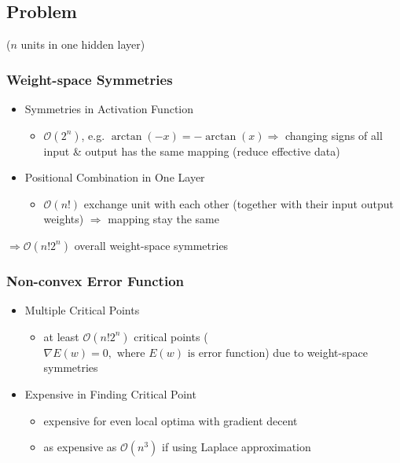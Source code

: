 \subsection{Problem}
($n$ units in one hidden layer)

\subsubsection{Weight-space Symmetries} 
\begin{itemize}
\item Symmetries in Activation Function
	\begin{itemize}
	\item $\mathcal{O}(2^n)$, e.g. $\arctan(-x) = -\arctan(x) \Rightarrow$ changing signs of all input \& output has the same mapping (reduce effective data)
	\end{itemize}
\item Positional Combination in One Layer
	\begin{itemize}
	\item $\mathcal{O}(n!)$ exchange unit with each other (together with their input output weights) $\Rightarrow$ mapping stay the same
	\end{itemize}
\end{itemize}
$\Rightarrow \mathcal O(n!2^n)$ overall weight-space symmetries

\subsubsection{Non-convex Error Function}
\begin{itemize}
\item Multiple Critical Points
	\begin{itemize}
	\item at least $\mathcal O (n!2^n)$ critical points ($\nabla E(w) = 0, \text{ where } E(w) \text{ is error function}$) due to weight-space symmetries
	\end{itemize}
\item Expensive in Finding Critical Point
	\begin{itemize}
	\item expensive for even local optima with gradient decent
	\item as expensive as $\mathcal O(n^3)$ if using Laplace approximation
	\end{itemize}	
\end{itemize}

